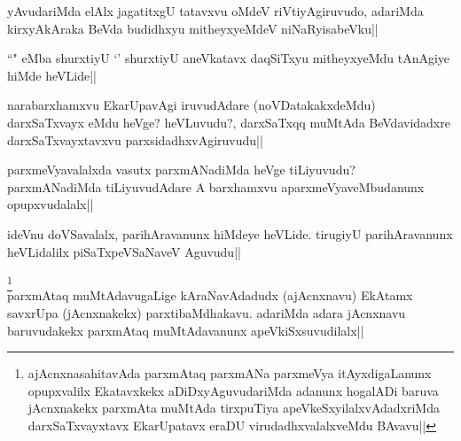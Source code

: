 
\begin{artha} 
yAvudariMda elAlx jagatitxgU tatavxvu oMdeV riVtiyAgiruvudo, adariMda 
kirxyAkAraka BeVda budidhxyu mitheyxyeMdeV niNaRyisabeVku||
\end{artha}


\begin{artha} 
``\stext" eMba shurxtiyU `\stext' shurxtiyU aneVkatavx daqSiTxyu 
mitheyxyeMdu tAnAgiye hiMde heVLide||
\end{artha}


\begin{artha} 
narabarxhamxvu EkarUpavAgi iruvudAdare (noVDatakakxdeMdu) darxSaTxvayx 
eMdu heVge? heVLuvudu?, darxSaTxqq muMtAda BeVdavidadxre 
darxSaTxvayxtavxvu parxsidadhxvAgiruvudu||
\end{artha}


\begin{artha} 
parxmeVyavalalxda vasutx parxmANadiMda heVge tiLiyuvudu? parxmANadiMda 
tiLiyuvudAdare A barxhamxvu aparxmeVyaveMbudanunx opupxvudalalx||
\end{artha}


\begin{artha} 
ideVnu doVSavalalx, parihAravanunx hiMdeye heVLide. tirugiyU 
parihAravanunx heVLidalilx piSaTxpeVSaNaveV Aguvudu||
\end{artha}


\begin{artha} 
\footnote[1]{ajAcnxnasahitavAda parxmAtaq parxmANa parxmeVya 
itAyxdigaLanunx opupxvalilx Ekatavxkekx aDiDxyAguvudariMda adanunx 
hogalADi baruva jAcnxnakekx parxmAta muMtAda tirxpuTiya 
apeVkeSxyilalxvAdadxriMda darxSaTxvayxtavx EkarUpatavx eraDU 
virudadhxvalalxveMdu BAvavu||}\\
parxmAtaq muMtAdavugaLige kAraNavAdadudx (ajAcnxnavu) EkAtamx savxrUpa 
(jAcnxnakekx) parxtibaMdhakavu. adariMda adara jAcnxnavu baruvudakekx 
parxmAtaq muMtAdavanunx apeVkiSxsuvudilalx||
\end{artha}

